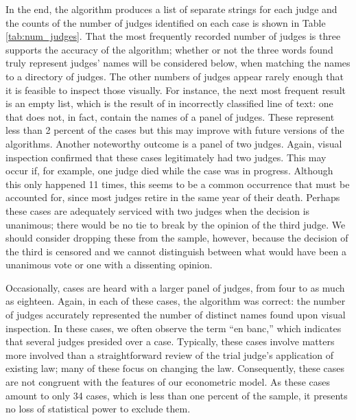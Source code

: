 \documentclass[11pt]{paper}
\begin{document}
In the end, the algorithm produces a list of separate strings for each judge
and the counts of the number of judges identified on each case is shown
in Table \ref{tab:num_judges}.
That the most frequently recorded number of judges is three
supports the accuracy of the algorithm;
whether or not the three words found truly represent judges' names
will be considered below, when matching the names to 
a directory of judges. 
The other numbers of judges appear rarely enough that it 
is feasible to inspect those visually.
For instance, the next most frequent result is an empty list, 
which is the result of in incorrectly classified line of text:
one that does not, in fact, contain the names of a panel of judges. 
These represent less than 2 percent of the cases but this may improve 
with future versions of the algorithms. 
Another noteworthy outcome is a panel of two judges. 
Again, visual inspection confirmed that these cases legitimately had two judges. 
This may occur if, for example, one judge died while the case was in progress. 
Although this only happened 11 times, this seems to be a common occurrence that must be accounted for, since most judges retire in the same year of their death. 
Perhaps these cases are adequately serviced with two judges when the decision is 
unanimous; there would be no tie to break by the opinion of the third judge. 
We should consider dropping these from the sample, however, 
because the decision of the third is censored and we cannot distinguish 
between what would have been a unanimous vote or one with a dissenting opinion. 

Occasionally, cases are heard with a larger panel of judges, 
from four to as much as eighteen. 
Again, in each of these cases, the algorithm was correct: 
the number of judges accurately represented the number of distinct names
found upon visual inspection.
In these cases, we often observe the term ``en banc,''
which indicates that several judges presided over a case.
Typically, these cases involve matters more involved than a straightforward
review of the trial judge's application of existing law;
many of these focus on changing the law.  
Consequently, these cases are not congruent with the features of our econometric model.
As these cases amount to only 34 cases, which is less than one percent of the sample, 
it presents no loss of statistical power to exclude them.  
\end{document}
